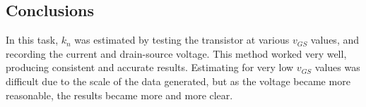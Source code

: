 \documentclass[notitlepage, 12pt]{report}  %
\begin{document}
\subsection*{Conclusions}
In this task, $k_n$ was estimated by testing the transistor at various $v_{GS}$ values, and recording the current and drain-source voltage. 
This method worked very well, producing consistent and accurate results. Estimating for very low $v_{GS}$ values was difficult due to the
scale of the data generated, but as the voltage became more reasonable, the results became more and more clear. \\

\newpage

\printbibliography[title={\Large References}] %
\end{document}
